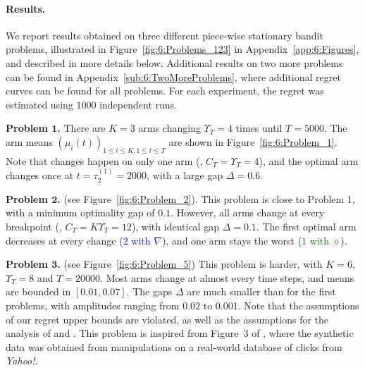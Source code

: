 \paragraph{Results.}
\label{sub:6:NumericalResults}

We report results obtained on three different piece-wise stationary bandit problems, illustrated in Figure~\ref{fig:6:Problems_123} in Appendix~\ref{app:6:Figures}, and described in more details below. Additional results on two more problems can be found in Appendix~\ref{sub:6:TwoMoreProblems}, where additional regret curves can be found for all problems. For each experiment, the regret was estimated using $1000$ independent runs.



\textbf{Problem $\bm 1$.} There are $K=3$ arms changing $\Upsilon_T=4$ times until $T=5000$.
The arm means $(\mu_i(t))_{1\leq i\leq K,1\leq t\leq T}$ are shown in Figure~\ref{fig:6:Problem_1}.
Note that changes happen on only one arm (\ie, $C_T=\Upsilon_T=4$),
and the optimal arm changes once at $t=\tau_2^{(1)}=2000$, with a large gap $\Delta=0.6$.


\textbf{Problem $\bm 2$.} (see Figure~\ref{fig:6:Problem_2}). This problem is close to Problem 1, with a minimum optimality gap of $0.1$.
However, all arms change at every breakpoint (\ie, $C_T=K\Upsilon_T=12$), with identical gap $\Delta=0.1$.
The first optimal arm decreases at every change (\textcolor{blue}{$2$ with $\nabla$}), and one arm stays the worst (\textcolor{darkgreen}{$1$ with $\diamond$}).



\textbf{Problem $\bm 3$.} (see Figure~\ref{fig:6:Problem_5}) This problem is harder, with $K=6$, $\Upsilon_T=8$ and $T=20000$.
Most arms change at almost every time steps,
and means are bounded in $[0.01, 0.07]$.
The gaps $\Delta$ are much smaller than for the first problems, with amplitudes ranging from $0.02$ to $0.001$.
Note that the assumptions of our regret upper bounds are violated, as well as the assumptions for the analysis of \MUCB{} and \CUSUMUCB.
This problem is inspired from Figure~3 of \cite{CaoZhenKvetonXie18}, where the synthetic data was obtained from manipulations on a real-world database of clicks from \emph{Yahoo!}.

